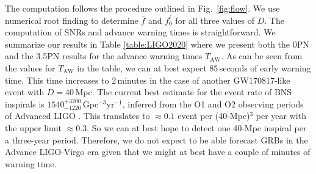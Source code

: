 \documentclass[amsmath,amssymb,aps,floats,amsfonts,notitlepage,superscriptaddress,eqsecnum,nofootinbib,10pt]{revtex4-1}
\begin{document}
The computation follows the procedure outlined in Fig.~\ref{fig:flow}. We use numerical root finding to determine $\bar{f}$ and $f_0^i$ for all three values of $D$. 
The computation of SNRs and advance warning times is straightforward. 
We summarize our results in Table \ref{table:LIGO2020} where we present both the 0PN and the 3.5PN results for the advance warning times
$T_\text{AW}$. As can be seen from the values for $T_\text{AW}$ in the table, we can at best expect 85\,seconds of early warning time.
This time increases to 2\,minutes in the case of another GW170817-like event with $D=40\,$Mpc.
The current best estimate for the event rate of BNS inspirals is $ 1540^{+3200}_{-1220}\,$Gpc$^{-3}$yr$^{-1}$, inferred from the O1 and O2 observing periods of Advanced LIGO \cite{GW170817}.
This translates to $\approx 0.1$ event per (40-Mpc)$^3$ per year with the upper limit $\approx 0.3$. So we can at best hope to detect
one 40-Mpc inspiral per a three-year period.
Therefore, we do not expect to be able forecast GRBs in the Advance LIGO-Virgo era given that we might at best have a couple of minutes of warning time. 
%
%
\end{document}
